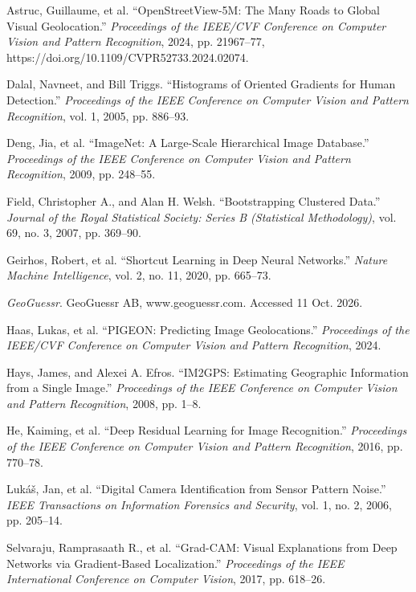 \documentclass[clean,twocolumn]{bam-project}
\begin{document}
\begin{description}[leftmargin=2em,labelindent=0pt,font=\normalfont,itemsep=2pt]\small
\item Astruc, Guillaume, et al. ``OpenStreetView-5M: The Many Roads to Global Visual Geolocation.'' \emph{Proceedings of the IEEE/CVF Conference on Computer Vision and Pattern Recognition}, 2024, pp. 21967--77, https://doi.org/10.1109/CVPR52733.2024.02074.
\item Dalal, Navneet, and Bill Triggs. ``Histograms of Oriented Gradients for Human Detection.'' \emph{Proceedings of the IEEE Conference on Computer Vision and Pattern Recognition}, vol. 1, 2005, pp. 886--93.
\item Deng, Jia, et al. ``ImageNet: A Large-Scale Hierarchical Image Database.'' \emph{Proceedings of the IEEE Conference on Computer Vision and Pattern Recognition}, 2009, pp. 248--55.
\item Field, Christopher A., and Alan H. Welsh. ``Bootstrapping Clustered Data.'' \emph{Journal of the Royal Statistical Society: Series B (Statistical Methodology)}, vol. 69, no. 3, 2007, pp. 369--90.
\item Geirhos, Robert, et al. ``Shortcut Learning in Deep Neural Networks.'' \emph{Nature Machine Intelligence}, vol. 2, no. 11, 2020, pp. 665--73.
\item \emph{GeoGuessr}. GeoGuessr AB, www.geoguessr.com. Accessed 11 Oct. 2026.
\item Haas, Lukas, et al. ``PIGEON: Predicting Image Geolocations.'' \emph{Proceedings of the IEEE/CVF Conference on Computer Vision and Pattern Recognition}, 2024.
\item Hays, James, and Alexei A. Efros. ``IM2GPS: Estimating Geographic Information from a Single Image.'' \emph{Proceedings of the IEEE Conference on Computer Vision and Pattern Recognition}, 2008, pp. 1--8.
\item He, Kaiming, et al. ``Deep Residual Learning for Image Recognition.'' \emph{Proceedings of the IEEE Conference on Computer Vision and Pattern Recognition}, 2016, pp. 770--78.
\item Luk\'a\v{s}, Jan, et al. ``Digital Camera Identification from Sensor Pattern Noise.'' \emph{IEEE Transactions on Information Forensics and Security}, vol. 1, no. 2, 2006, pp. 205--14.
\item Selvaraju, Ramprasaath R., et al. ``Grad-CAM: Visual Explanations from Deep Networks via Gradient-Based Localization.'' \emph{Proceedings of the IEEE International Conference on Computer Vision}, 2017, pp. 618--26.

\end{description}
\end{document}

